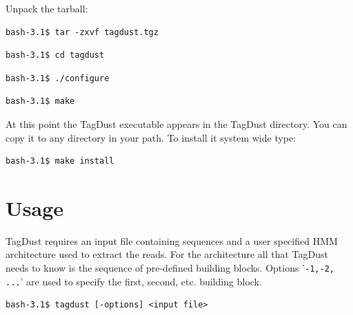 \documentclass[11pt,a4paper,oneside]{book}
\begin{document}
Unpack the tarball:

\begin{verbatim}
bash-3.1$ tar -zxvf tagdust.tgz 
\end{verbatim}

\begin{verbatim}
bash-3.1$ cd tagdust
\end{verbatim}


\begin{verbatim}
bash-3.1$ ./configure
\end{verbatim}
\begin{verbatim}
bash-3.1$ make
\end{verbatim}
At this point the TagDust executable appears in the TagDust directory. You can copy it to any directory in your path. To install it system wide type:  
\begin{verbatim}
bash-3.1$ make install
\end{verbatim}
\chapter{Usage}

TagDust requires an input file containing sequences and a user specified HMM architecture used to extract the reads. For the architecture all that TagDust needs to know is the sequence of pre-defined building blocks. Options '{\tt -1,-2, ...}' are used to specify the first, second, etc. building block.

\begin{verbatim}
bash-3.1$ tagdust [-options] <input file>  
\end{verbatim}

\end{document}
